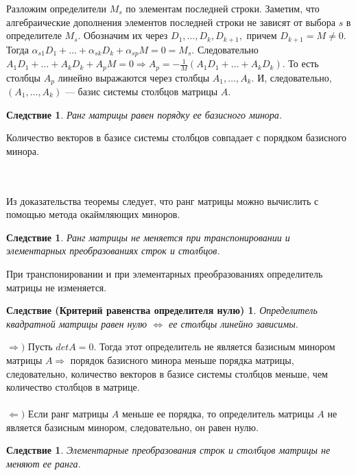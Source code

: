 \begin{Proof}
	Разложим определители $M_s$ по элементам последней строки. Заметим, что алгебраические дополнения элементов последней строки не зависят от выбора $s$ в определителе $M_s$. Обозначим их через $D_1,\dots, D_k,D_{k+1},$ причем $D_{k+1} = M \ne 0$. Тогда
	$\alpha_{s1}D_{1} + \ldots +\alpha_{sk}D_{k} + \alpha_{sp}M = 0 = M_{s}$. Следовательно
	$A_{1}D_{1} + \ldots + A_{k}D_{k} + A_{p}M = 0\Rightarrow A_p = -\frac{1}{M}(A_{1}D_{1} + \ldots + A_{k}D_{k})$. То есть столбцы $A_p$ линейно выражаются через столбцы $A_1,\dots, A_k$. И, следовательно, $(A_1,\dots, A_k)$ --- базис системы столбцов матрицы $A$.
\end{Proof}
\newtheorem*{cor10_7_1}{Следствие}\begin{cor10_7_1}Ранг матрицы равен порядку ее базисного минора.
\end{cor10_7_1}\begin{Proof}
	Количество векторов в базисе системы столбцов совпадает с порядком базисного минора.
\end{Proof}\\\\
Из доказательства теоремы следует, что ранг матрицы можно вычислить с помощью метода окаймляющих миноров.
\newtheorem*{cor10_7_2}{Следствие}\begin{cor10_7_2}Ранг матрицы не меняется при транспонировании и элементарных преобразованиях строк и столбцов.
\end{cor10_7_2}\begin{Proof}
	При транспонировании и при элементарных преобразованиях определитель матрицы не изменяется.
\end{Proof}
\newtheorem*{cor10_7_3}{Следствие (Критерий равенства определителя нулю)}\begin{cor10_7_3}Определитель квадратной матрицы равен нулю $\Longleftrightarrow$ ее столбцы линейно зависимы.
\end{cor10_7_3}\begin{Proof}
	$\Rightarrow)$ Пусть $detA = 0$. Тогда этот определитель не является базисным минором матрицы $A\Rightarrow $ порядок базисного минора меньше порядка матрицы, следовательно, количество векторов в базисе системы столбцов меньше, чем количество столбцов в матрице.\\\\
	$\Leftarrow)$ Если ранг матрицы $A$ меньше ее порядка, то определитель матрицы $A$ не является базисным минором, следовательно, он равен нулю.
\end{Proof}
\newtheorem*{cor10_7_4}{Следствие}\begin{cor10_7_4}Элементарные преобразования строк и столбцов матрицы не меняют ее ранга.
\end{cor10_7_4}
